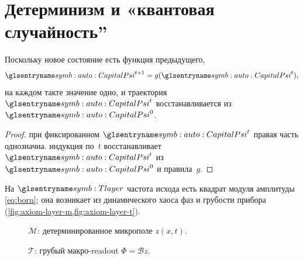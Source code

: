 \section{Детерминизм и «квантовая случайность''}

\begin{proposition}
\label{prop:determinism}
Поскольку новое состояние есть функция предыдущего,
\[
  \symCapitalPsi^{t+1}=g(\symCapitalPsi^t),
\]
на каждом такте значение одно, и траектория $\symCapitalPsi^t$ восстанавливается из $\symCapitalPsi^0$.
\end{proposition}

\begin{proof}
при фиксированном $\symCapitalPsi^t$ правая часть однозначна.
\phence индукция по~$t$ восстанавливает $\symCapitalPsi^t$ из $\symCapitalPsi^0$ и правила~$g$.
\end{proof}

На $\Tlayer$ частота исхода есть квадрат модуля амплитуды \eqref{eq:born};
она возникает из динамического хаоса фаз и грубости прибора (\cref{fig:axiom-layer-m,fig:axiom-layer-t}).

\begin{figure}[htbp]
  \centering
  
  \caption{$\mathcal{M}$: детерминированное микрополе $z(x,t)$.}
  \label{fig:axiom-layer-m}
\end{figure}

\begin{figure}[htbp]
  \centering
  
  \caption{$\mathcal{T}$: грубый макро-readout $\Phi=\mathcal{B}z$.}
  \label{fig:axiom-layer-t}
\end{figure}

